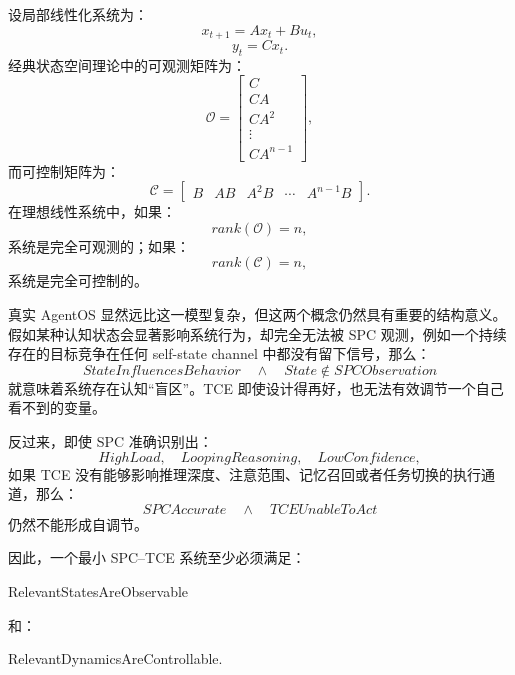 设局部线性化系统为：
\begin{equation}
x_{t+1}
=
Ax_t+Bu_t,
\end{equation}
\begin{equation}
y_t=Cx_t.
\end{equation}
经典状态空间理论中的可观测矩阵为：
\begin{equation}
\mathcal O
=
\begin{bmatrix}
C\\
CA\\
CA^2\\
\vdots\\
CA^{n-1}
\end{bmatrix},
\end{equation}
而可控制矩阵为：
\begin{equation}
\mathcal C
=
\begin{bmatrix}
B&
AB&
A^2B&
\cdots&
A^{n-1}B
\end{bmatrix}.
\end{equation}
在理想线性系统中，如果：
\begin{equation}
rank(\mathcal O)=n,
\end{equation}
系统是完全可观测的；如果：
\begin{equation}
rank(\mathcal C)=n,
\end{equation}
系统是完全可控制的。

真实 AgentOS 显然远比这一模型复杂，但这两个概念仍然具有重要的结构意义。假如某种认知状态会显著影响系统行为，却完全无法被 SPC 观测，例如一个持续存在的目标竞争在任何 self-state channel 中都没有留下信号，那么：
\begin{equation}
StateInfluencesBehavior
\quad\land\quad
State\notin SPCObservation
\end{equation}
就意味着系统存在认知``盲区''。TCE 即使设计得再好，也无法有效调节一个自己看不到的变量。

反过来，即使 SPC 准确识别出：
\begin{equation}
HighLoad,
\quad
LoopingReasoning,
\quad
LowConfidence,
\end{equation}
如果 TCE 没有能够影响推理深度、注意范围、记忆召回或者任务切换的执行通道，那么：
\begin{equation}
SPCAccurate
\quad\land\quad
TCEUnableToAct
\end{equation}
仍然不能形成自调节。

因此，一个最小 SPC--TCE 系统至少必须满足：
\begin{statementbox}
RelevantStatesAreObservable
\end{statementbox}
和：
\begin{statementbox}
RelevantDynamicsAreControllable.
\end{statementbox}


